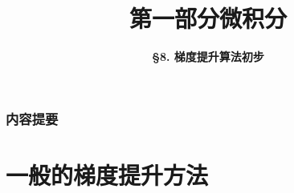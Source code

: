 




\title[Calculus]{\LARGE \bfseries 第一部分\quad 微积分} %
\author[Gradient Boosting Machine] %
{\Large \bfseries \S 8. 梯度提升算法初步
}
\date{}



\begin{frame}
\titlepage %
\end{frame}

\begin{frame}
\frametitle{内容提要} %
\tableofcontents %
\end{frame}


\section{一般的梯度提升方法} %

